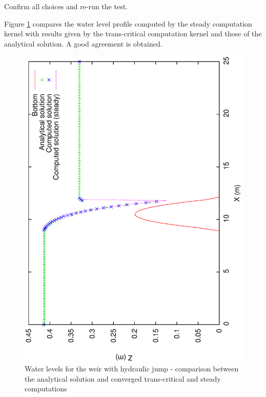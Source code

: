\documentclass[a4paper,12pt]{article}
\begin{document}
\vspace{0.5cm}

Confirm all choices and re-run the test.

\vspace{0.5cm}

Figure \ref{fig:level-weir-jump} compares the water level profile computed  
by the steady computation kernel with results given by the trans-critical computation
kernel and those of the analytical solution. A good agreement is obtained.

\begin{figure}[h]
  \begin{center}
  \includegraphics[scale=0.5,angle=-90]{Zavecchoc}
  \caption{Water levels for the weir with hydraulic jump - comparison between the analytical solution and converged trans-critical and steady computations}
  \label{fig:level-weir-jump}
  \end{center}
\end{figure}
\end{document}
